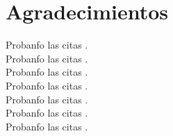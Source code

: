 

\chapter*{Agradecimientos} 

\lipsum[7]

Probanfo las citas \cite{bentley:1999}. \\
Probanfo las citas \cite{bringhurst:2002} . \\
Probanfo las citas \cite{cormen:2001} . \\
Probanfo las citas \cite{dueck:trio} . \\
Probanfo las citas \cite{knuth:1976} . \\
Probanfo las citas \cite{knuth:1974} . \\
Probanfo las citas \cite{sommerville:1992} . \\

